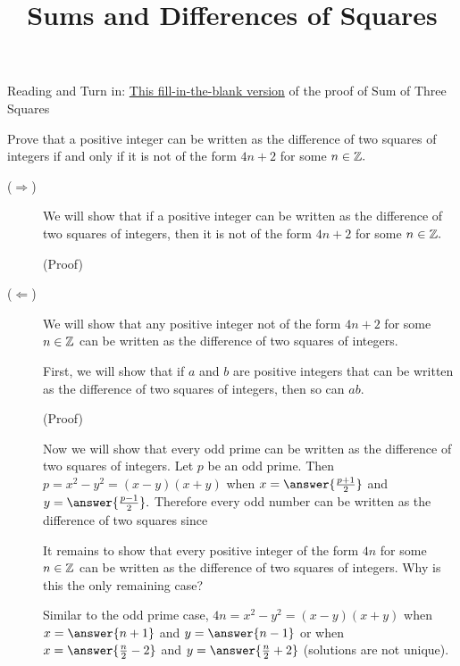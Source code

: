 \documentclass{ximera}
\title{Sums and Differences of Squares}
\begin{document}
\begin{abstract}
\end{abstract}
\maketitle


\begin{pre}
    \item[Reading and Turn in:] \href{https://ximera.osu.edu/elementarynt/MATH4573Online/ElementaryNumberTheory/MATH4573Online/April10/April10}{This fill-in-the-blank version} of the proof of Sum of Three Squares
\end{pre}


\begin{br}
	Prove that a positive integer can be written as the difference of two squares of integers if and only if it is not of the form $4n + 2$ for some $n\in\mathbb Z.$
	\begin{solution}
	\begin{description}
	 	\item[($\Rightarrow$)] We will show that if a positive integer can be written as the difference of two squares of integers, then it is not of the form $4n + 2$ for some $n\in\mathbb Z.$

	 	(Proof)
	  
		\item[($\Leftarrow$)] We will show that any positive integer not of the form $4n + 2$ for some $n\in\mathbb Z$ can be written as the difference of two squares of integers. 
	  
		First, we will show that if $a$ and $b$ are positive integers that can be written as the difference of two squares of integers, then so can $ab.$
		
		(Proof)
	

		Now we will show that every odd prime can be written as the difference of two squares of integers. Let $p$ be an odd prime. Then $p=x^2-y^2=(x-y)(x+y)$ when $x=\answer{\frac{p+1}{2}}$ and $y=\answer{\frac{p-1}{2}}.$
		Therefore every odd number can be written as the difference of two squares since  %
	
		It remains to show that every positive integer of the form $4n$ for some $n\in\mathbb Z$ can be written as the difference of two squares of integers. Why is this the only remaining case?
	
		Similar to the odd prime case, $4n=x^2-y^2=(x-y)(x+y)$ when $x=\answer{n+1}$ and $y=\answer{n-1}$ or when $x=\answer{\frac{n}{2}-2}$ and $y=\answer{\frac{n}{2}+2}$ (solutions are not unique).
	\end{description}
\end{solution}
\end{br}
\end{document}
